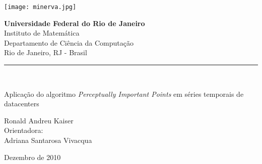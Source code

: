 \begin{titlepage}
  \begin{minipage}{0.2\linewidth}

      \texttt{[image: minerva.jpg]}

  \end{minipage}
  \begin{minipage}{0.8\linewidth}
    \textbf{Universidade Federal do Rio de Janeiro} \\
    Instituto de Matemática \\
    Departamento de Ciência da Computação \\
    Rio de Janeiro, RJ - Brasil\\
    \rule{0.8\linewidth}{0.2mm}\\

  \end{minipage}

  \begin{center}
  \vspace{4cm}
  \Large
  Aplicação do algoritmo \textit{Perceptually Important Points} em séries temporais de datacenters
  \end{center}

  \begin{center}
  \vspace{0.25cm}
  \normalsize
  Ronald Andreu Kaiser \\
  Orientadora: \\Adriana Santarosa Vivacqua
  \end{center}
  \vfill

  \begin{center}
  Dezembro de 2010
  \end{center}

  \vspace{2cm}
\end{titlepage}
